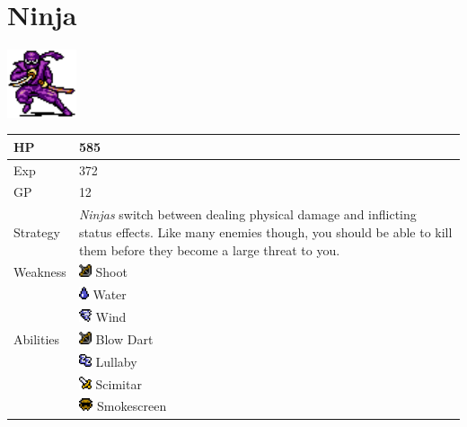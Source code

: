 \section{Ninja}
\label{monster:ninja}

\includegraphics[height=2cm,keepaspectratio]{./resources/monster/ninja}

\begin{longtable}{ l p{9cm} }
	HP
	& 585
\\ \hline
	Exp
	& 372
\\ \hline
	GP
	& 12
\\ \hline
	Strategy
	& \textit{Ninjas} switch between dealing physical damage and inflicting status effects. Like many enemies though, you should be able to kill them before they become a large threat to you.
\\ \hline
	Weakness
	& \includegraphics[height=1em,keepaspectratio]{./resources/effects/shoot} Shoot \\
	& \includegraphics[height=1em,keepaspectratio]{./resources/effects/water} Water \\
	& \includegraphics[height=1em,keepaspectratio]{./resources/effects/wind} Wind
\\ \hline
	Abilities
	& \includegraphics[height=1em,keepaspectratio]{./resources/effects/shoot} Blow Dart \\
	& \includegraphics[height=1em,keepaspectratio]{./resources/effects/sleep} Lullaby \\
	& \includegraphics[height=1em,keepaspectratio]{./resources/effects/damage} Scimitar \\
	& \includegraphics[height=1em,keepaspectratio]{./resources/effects/blind} Smokescreen
\end{longtable}
